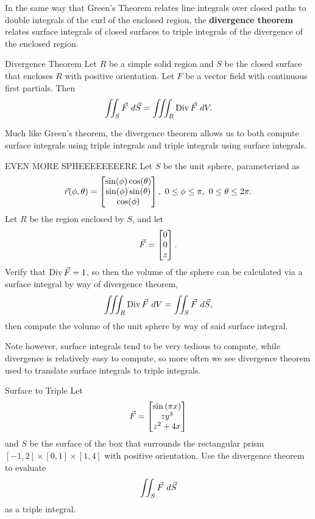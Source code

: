 In the same way that Green's Theorem relates line integrals over closed paths to double integrals of the curl of the enclosed region, the \textbf{divergence theorem} relates surface integrals of closed surfaces to triple integrals of the divergence of the enclosed region.

\begin{theorem}{Divergence Theorem}
Let $R$ be a simple solid region and $S$ be the closed surface that encloses $R$ with positive orientation. Let $F$ be a vector field with continuous first partials. Then $$\iint_S \vcF \ d\vcS=\iiint_R \divo\vcF \ dV.$$
\end{theorem}

Much like Green's theorem, the divergence theorem allows us to both compute surface integrals using triple integrals and triple integrals using surface integrals. 

\begin{exercise}{EVEN MORE SPHEEEEEEEERE}
Let $S$ be the unit sphere, parameterized as $$\vec{r}(\phi,\theta)=\begin{bmatrix}\sin(\phi)\cos(\theta)\\\sin(\phi)\sin(\theta)\\\cos(\phi)\end{bmatrix}, \ 0\leq \phi\leq \pi,\ 0\leq\theta\leq2\pi.$$
Let $R$ be the region enclosed by $S$, and let $$\vec{F}=\begin{bmatrix}0\\0\\z\end{bmatrix}.$$ Verify that $\operatorname{Div}\vec{F}=1$, so then the volume of the sphere can be calculated via a surface integral by way of divergence theorem, $$\iiint_R \divo\vcF \ dV=\iint_S \vcF \ d\vcS,$$ then compute the volume of the unit sphere by way of said surface integral.
\end{exercise}

Note however, surface integrals tend to be very tedious to compute, while divergence is relatively easy to compute, so more often we see divergence theorem used to translate surface integrals to triple integrals.

\begin{pexercise}{Surface to Triple}
Let $$\vec{F}=\begin{bmatrix}\sin{(\pi x)}\\ zy^3\\z^2+4x\end{bmatrix}$$ and $S$ be the surface of the box that surrounds the rectangular prism $[-1,2]\times[0,1]\times[1,4]$ with positive orientation. Use the divergence theorem to evaluate $$\iint_S \vec{F} \ d\vec{S} $$ as a triple integral.
\end{pexercise}